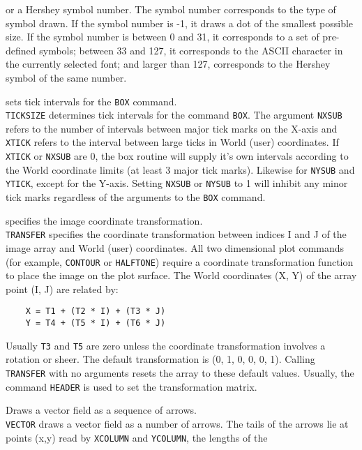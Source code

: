 	or a Hershey symbol number.  The symbol number corresponds to
	the type of symbol drawn.  If the symbol number is -1, it
	draws a dot of the smallest possible size.  If the symbol number
	is between 0 and 31, it corresponds to a set of pre-defined symbols;
	between 33 and 127, it corresponds to the ASCII character in the
	currently selected font; and larger than 127, corresponds to the
	Hershey symbol of the same number.
\item [{\tt TICKSIZE XTICK NXSUB YTICK NYSUB } --] sets tick intervals for the {\tt BOX} command.\\
	{\tt TICKSIZE} determines tick intervals for the command
	{\tt BOX}.  The argument {\tt NXSUB}
	refers to the number of intervals between major tick marks on
	the X-axis and {\tt XTICK} refers to the interval between
	large ticks in World (user) coordinates.  If {\tt XTICK}
	or {\tt NXSUB} are 0, the box routine will supply it's
	own intervals according to the World coordinate limits (at
	least 3 major tick marks).  Likewise for {\tt NYSUB} and
	{\tt YTICK}, except for the Y-axis.  Setting
	{\tt NXSUB} or {\tt NYSUB} to 1 will inhibit any
	minor tick marks regardless of the arguments to the
	{\tt BOX} command.
\item [{\tt TRANSFER T1 T2 T3 T4 T5 T6 } --] specifies the image coordinate transformation.\\
	{\tt TRANSFER} specifies the coordinate transformation
	between indices I and J of the image array and World (user)
	coordinates.  All two dimensional plot commands (for example,
	{\tt CONTOUR} or
	{\tt HALFTONE}) require a
	coordinate transformation function to place the image on the
	plot surface.  The World coordinates (X, Y) of the array point
	(I, J) are related by:
	\begin{verbatim}
    X = T1 + (T2 * I) + (T3 * J)
    Y = T4 + (T5 * I) + (T6 * J)
	\end{verbatim}
	Usually {\tt T3} and {\tt T5} are zero unless
	the coordinate transformation involves a rotation or sheer.
	The default transformation is (0, 1, 0, 0, 0, 1).  Calling
	{\tt TRANSFER} with no arguments resets the array to
	these default values.  Usually, the command
	{\tt HEADER} is used to set the
	transformation matrix.
\item [{\tt VECTOR [ANGLE [VENT]] } --] Draws a vector field as a sequence of arrows.\\
	{\tt VECTOR} draws a vector field as a number of arrows.
	The tails of the arrows lie at points (x,y) read by
	{\tt XCOLUMN} and
	{\tt YCOLUMN}, the lengths of the
